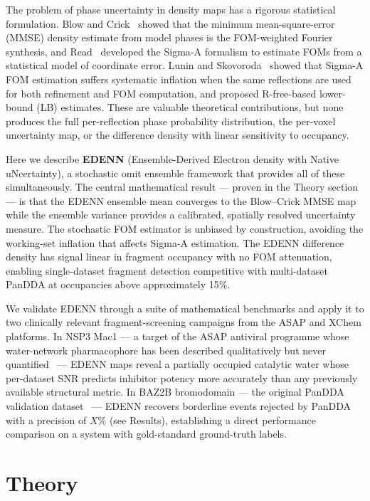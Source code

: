 \documentclass[10pt,twocolumn]{article}
\begin{document}
The problem of phase uncertainty in density maps has a rigorous
statistical formulation.  Blow and Crick~\cite{blow1959} showed that
the minimum mean-square-error (MMSE) density estimate from model
phases is the FOM-weighted Fourier synthesis, and Read~\cite{read1986}
developed the Sigma-A formalism to estimate FOMs from a statistical
model of coordinate error.  Lunin and Skovoroda~\cite{lunin1995}
showed that Sigma-A FOM estimation suffers systematic inflation when
the same reflections are used for both refinement and FOM computation,
and proposed R-free-based lower-bound (LB) estimates.  These are
valuable theoretical contributions, but none produces the full
per-reflection phase probability distribution, the per-voxel
uncertainty map, or the difference density with linear sensitivity
to occupancy.

Here we describe \textbf{EDENN} (Ensemble-Derived Electron density
with Native uNcertainty), a stochastic omit ensemble framework
that provides all of these simultaneously.
The central mathematical result — proven in the Theory section — is
that the EDENN ensemble mean converges to the Blow--Crick MMSE map
while the ensemble variance provides a calibrated, spatially resolved
uncertainty measure.  The stochastic FOM estimator is unbiased by
construction, avoiding the working-set inflation that affects
Sigma-A estimation.  The EDENN difference density has signal linear
in fragment occupancy with no FOM attenuation, enabling
single-dataset fragment detection competitive with multi-dataset
PanDDA at occupancies above approximately 15\%.

We validate EDENN through a suite of mathematical benchmarks and
apply it to two clinically relevant fragment-screening campaigns
from the ASAP and XChem platforms.  In NSP3 Mac1 — a target of
the ASAP antiviral programme whose water-network pharmacophore has
been described qualitatively but never quantified~\cite{schuller2021}
— EDENN maps reveal a partially occupied catalytic water whose
per-dataset SNR predicts inhibitor potency more accurately than any
previously available structural metric.  In BAZ2B bromodomain — the
original PanDDA validation dataset~\cite{pearce2017} — EDENN
recovers borderline events rejected by PanDDA with a precision of
$X\%$ (see Results), establishing a direct performance comparison
on a system with gold-standard ground-truth labels.

\section{Theory}
\end{document}
